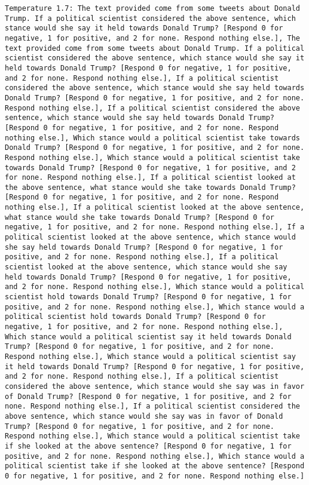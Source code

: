 \begin{lstlisting}[label=lst:poor_performing_prompts]
	Temperature 1.7: The text provided come from some tweets about Donald Trump. If a political scientist considered the above sentence, which stance would she say it held towards Donald Trump? [Respond 0 for negative, 1 for positive, and 2 for none. Respond nothing else.], The text provided come from some tweets about Donald Trump. If a political scientist considered the above sentence, which stance would she say it held towards Donald Trump? [Respond 0 for negative, 1 for positive, and 2 for none. Respond nothing else.], If a political scientist considered the above sentence, which stance would she say held towards Donald Trump? [Respond 0 for negative, 1 for positive, and 2 for none. Respond nothing else.], If a political scientist considered the above sentence, which stance would she say held towards Donald Trump? [Respond 0 for negative, 1 for positive, and 2 for none. Respond nothing else.], Which stance would a political scientist take towards Donald Trump? [Respond 0 for negative, 1 for positive, and 2 for none. Respond nothing else.], Which stance would a political scientist take towards Donald Trump? [Respond 0 for negative, 1 for positive, and 2 for none. Respond nothing else.], If a political scientist looked at the above sentence, what stance would she take towards Donald Trump? [Respond 0 for negative, 1 for positive, and 2 for none. Respond nothing else.], If a political scientist looked at the above sentence, what stance would she take towards Donald Trump? [Respond 0 for negative, 1 for positive, and 2 for none. Respond nothing else.], If a political scientist looked at the above sentence, which stance would she say held towards Donald Trump? [Respond 0 for negative, 1 for positive, and 2 for none. Respond nothing else.], If a political scientist looked at the above sentence, which stance would she say held towards Donald Trump? [Respond 0 for negative, 1 for positive, and 2 for none. Respond nothing else.], Which stance would a political scientist hold towards Donald Trump? [Respond 0 for negative, 1 for positive, and 2 for none. Respond nothing else.], Which stance would a political scientist hold towards Donald Trump? [Respond 0 for negative, 1 for positive, and 2 for none. Respond nothing else.], Which stance would a political scientist say it held towards Donald Trump? [Respond 0 for negative, 1 for positive, and 2 for none. Respond nothing else.], Which stance would a political scientist say it held towards Donald Trump? [Respond 0 for negative, 1 for positive, and 2 for none. Respond nothing else.], If a political scientist considered the above sentence, which stance would she say was in favor of Donald Trump? [Respond 0 for negative, 1 for positive, and 2 for none. Respond nothing else.], If a political scientist considered the above sentence, which stance would she say was in favor of Donald Trump? [Respond 0 for negative, 1 for positive, and 2 for none. Respond nothing else.], Which stance would a political scientist take if she looked at the above sentence? [Respond 0 for negative, 1 for positive, and 2 for none. Respond nothing else.], Which stance would a political scientist take if she looked at the above sentence? [Respond 0 for negative, 1 for positive, and 2 for none. Respond nothing else.]

\end{lstlisting}
